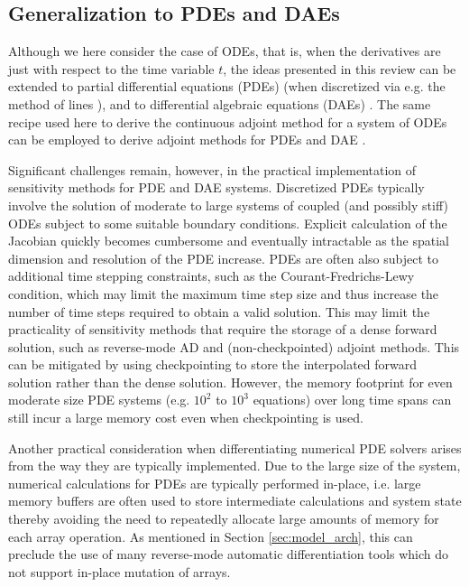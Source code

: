 \subsection{Generalization to PDEs and DAEs}



Although we here consider the case of ODEs, that is, when the derivatives are just with respect to the time variable $t$, the ideas presented in this review can be extended to partial differential equations (PDEs) (when discretized via e.g. the method of lines \cite{ascher2008numerical}), and to differential algebraic equations (DAEs) \cite{hairer-solving-2}.
The same recipe used here to derive the continuous adjoint method for a system of ODEs can be employed to derive adjoint methods for PDEs \cite{Giles_Pierce_2000} and DAE \cite{Cao_Li_Petzold_2002}. 

Significant challenges remain, however, in the practical implementation of sensitivity methods for PDE and DAE systems. 
Discretized PDEs typically involve the solution of moderate to large systems of coupled (and possibly stiff) ODEs subject to some suitable boundary conditions. 
Explicit calculation of the Jacobian quickly becomes cumbersome and eventually intractable as the spatial dimension and resolution of the PDE increase.
PDEs are often also subject to additional time stepping constraints, such as the Courant-Fredrichs-Lewy condition, which may limit the maximum time step size and thus increase the number of time steps required to obtain a valid solution. 
This may limit the practicality of sensitivity methods that require the storage of a dense forward solution, such as reverse-mode AD and (non-checkpointed) adjoint methods.
This can be mitigated by using checkpointing to store the interpolated forward solution rather than the dense solution.
However, the memory footprint for even moderate size PDE systems (e.g. $10^2$ to $10^3$ equations) over long time spans can still incur a large memory cost even when checkpointing is used.

Another practical consideration when differentiating numerical PDE solvers arises from the way they are typically implemented. 
Due to the large size of the system, numerical calculations for PDEs are typically performed in-place, i.e. large memory buffers are often used to store intermediate calculations and system state thereby avoiding the need to repeatedly allocate large amounts of memory for each array operation. 
As mentioned in Section \ref{sec:model_arch}, this can preclude the use of many reverse-mode automatic differentiation tools which do not support in-place mutation of arrays.


